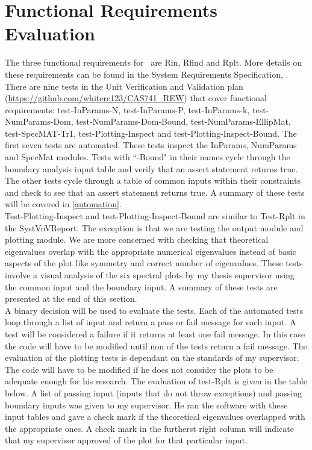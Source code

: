 \documentclass[12pt, titlepage]{article}
\begin{document}
\section{Functional Requirements Evaluation} \label{funct}

The three functional requirements for \progname \ are Rin, Rfind and 
Rplt. More details on these requirements can be found in the System 
Requirements Specification, \cite{SRS}. There are nine tests in the Unit 
Verification and Validation plan 
(\url{https://github.com/whitere123/CAS741_REW}) that cover functional 
requirements: test-InParams-N, test-InParams-P, test-InParams-k, 
test-NumParams-Dom, test-NumParams-Dom-Bound, test-NumParams-EllipMat, 
test-SpecMAT-Tr1, test-Plotting-Inspect and test-Plotting-Inspect-Bound. The 
first seven tests are automated. These tests inspect the InParams, NumParams 
and SpecMat modules. Tests with ``-Bound" in their names cycle through the 
boundary analysis input table and verify that an assert statement returns true. 
The other tests cycle through a table of common inputs within their constraints 
and check to see that an assert statement returns true. A summary of these 
tests will be covered in \ref{automation}. \\
Test-Plotting-Inspect and test-Plotting-Inspect-Bound are similar to Test-Rplt 
in the SystVnVReport. The exception is that we are testing the output module 
and plotting module. We are more concerned with checking that theoretical 
eigenvalues overlap with the appropriate numerical eigenvalues instead of basic 
aspects of the plot like symmetry and correct number of eigenvalues. These 
tests involve a visual analysis of the six spectral plots by my thesis 
supervisor using the common input and the boundary input. A summary of these 
tests are presented at the end of this section. \\ 
A binary decision will be used to evaluate the tests. Each of the automated 
tests loop through a list of input and return a pass or fail message for each 
input. A test will be considered a failure if it returns at least one 
fail 
message. In this case the code will have to be modified until non of the tests 
return a fail message. The evaluation of the plotting tests is dependant on the 
standards of my supervisor. The code will have to be modified if he does not 
consider the plots to be adequate enough for his research. The evaluation of 
test-Rplt is given in the table below. A list of passing input (inputs that do 
not throw exceptions) and passing boundary inputs was given to my supervisor. 
He ran the software with 
these input tables and gave a check mark if the theoretical eigenvalues 
overlapped 
with the appropriate ones. A check mark in the furtherst right column will 
indicate that my supervisor approved of the plot for that particular input.  
\end{document}
